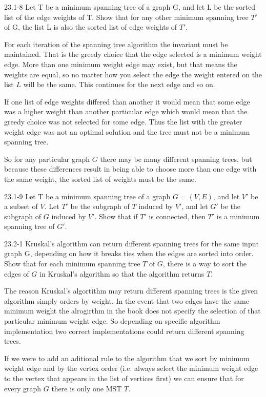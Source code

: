 \begin{problem}{23.1-8}
  Let T be a minimum spanning tree of a graph G, and let L be the sorted list of the edge weights of T. Show that for
  any other minimum spanning tree $T'$ of G, the list L is also the sorted list of edge weights of $T'$.
  \begin{solution}
    For each iteration of the spanning tree algorithm the invariant must be maintained. That is the greedy choice that
    the edge selected is a minimum weight edge.  More than one minimum weight edge may exist, but that means the weights
    are equal, so no matter how you select the edge the weight entered on the list $L$ will be the same. This continues
    for the next edge and so on.

    If one list of edge weights differed than another it would mean that some edge was a higher weight than another
    particular edge which would mean that the greedy choice was not selected for some edge. Thus the list with the
    greater weight edge was not an optimal solution and the tree must not be a minimum spanning tree.

    So for any particular graph $G$ there may be many different spanning trees, but because these differences result in
    being able to choose more than one edge with the same weight, the sorted list of weights must be the same.
  \end{solution}
\end{problem}

\begin{problem}{23.1-9}
  Let T be a minimum spanning tree of a graph $G = (V,E)$, and let $V'$ be a subset of $V$. Let $T'$ be the subgraph of
  $T$ induced by $V'$, and let $G'$ be the subgraph of $G$ induced by $V'$. Show that if $T'$ is connected, then $T'$ is
  a minimum spanning tree of $G'$.
\end{problem}

\begin{problem}{23.2-1}
  Kruskal's algorithm can return different spanning trees for the same input graph G, depending on how it breaks ties
  when the edges are sorted into order. Show that for each minimum spanning tree $T$ of $G$, there is a way to sort the
  edges of $G$ in Kruskal's algorithm so that the algorithm returns $T$.
  \begin{solution}
    The reason Kruskal's algortithm may return different spanning trees is the given algorithm simply orders by weight.
    In the event that two edges have the same minimum weight the alrogirthm in the book does not specify the selection
    of that particular minimum weight edge.  So depending on specific algorithm implementation two correct
    implementations could return different spanning trees.

    If we were to add an aditional rule to the algorithm that we sort by minimum weight edge and by the vertex order
    (i.e. always select the minimum weight edge to the vertex that appears in the list of vertices first) we can ensure
    that for every graph $G$ there is only one MST $T$.
  \end{solution}
\end{problem}

